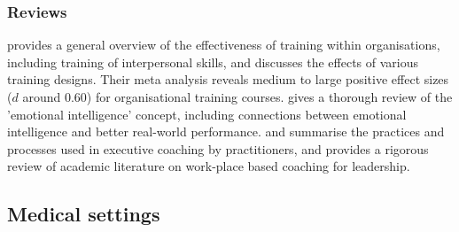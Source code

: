 \documentclass[prodmode,acmtochi]{acmsmall}
\newcommand{\GeraldineFIX}[1]{}
\newcommand{\rephrase}[1]{\textrm{\textrm{\textcolor{gray}{#1}}}}
\begin{document}
\subsubsection*{Reviews}   provides a general overview of the effectiveness of training within organisations, including training of interpersonal skills, and discusses the effects of various training designs. Their meta analysis reveals medium to large positive effect sizes  ($d$ around $0.60$) for organisational training courses.  gives a thorough review of the 'emotional intelligence' concept, including connections between emotional intelligence and better real-world performance.    and  summarise the practices and processes used in executive coaching by practitioners, and  provides a rigorous review of academic literature on work-place based coaching for leadership. \GeraldineFIX{G: ??? seeing you also mention coaching under the personal area?? ... P: But this review really does talk about work-place only, with particular focus on leadership}

\subsection{Medical settings}
\GeraldineFIX{ G: need to think about this TITLE bit more - is this meant to be medical as in just doctors, or medical in its broader sense? Eg doctors, nurses, allied health, therapists, etc ... in which case 'clinical settings' might be a more encompassing term.... }
\GeraldineFIX{ G: then in writing up. you can say you focus first on the medical profession ... and do the doctor-patient training .... and then look at other healthcare/clinical professions more generally eg including nurses, physios, counsellers/therapists etc???}
\GeraldineFIX{ G: Also think the section structure could be thought about a bit more ... eg is it useful to separate out different SEL foci:... \\
1. being a better dr and managing own HWB (eg mindfulness skills); \\
2. general clinican-patient relationship eg.\\
gathering information from patient (interview/question skills???); giving difficult news;  establishing collaboratively designed care plans, empowering patients to take own responsibility etc ... there is a term for this model fo care but can't remember! (eg as in motivational interviewing)}
\end{document}
